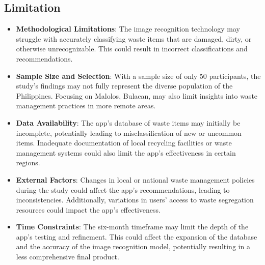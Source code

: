 	\subsection{Limitation}
	\begin{itemize}
		\item \textbf{Methodological Limitations}: The image recognition technology may struggle with accurately classifying waste items that are damaged, dirty, or otherwise unrecognizable. This could result in incorrect classifications and recommendations.
		
		\item \textbf{Sample Size and Selection}: With a sample size of only 50 participants, the study’s findings may not fully represent the diverse population of the Philippines. Focusing on Malolos, Bulacan, may also limit insights into waste management practices in more remote areas.
		
		\item \textbf{Data Availability}: The app’s database of waste items may initially be incomplete, potentially leading to misclassification of new or uncommon items. Inadequate documentation of local recycling facilities or waste management systems could also limit the app’s effectiveness in certain regions.
		
		\item \textbf{External Factors}: Changes in local or national waste management policies during the study could affect the app’s recommendations, leading to inconsistencies. Additionally, variations in users' access to waste segregation resources could impact the app's effectiveness.
		
		\item \textbf{Time Constraints}: The six-month timeframe may limit the depth of the app’s testing and refinement. This could affect the expansion of the database and the accuracy of the image recognition model, potentially resulting in a less comprehensive final product.
	\end{itemize}